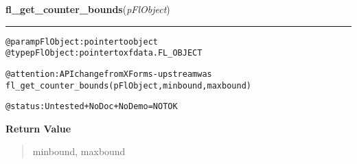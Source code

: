     \label{xformslib:flcounter:fl_get_counter_bounds}

    \vspace{0.5ex}

\hspace{.8\funcindent}\begin{boxedminipage}{\funcwidth}

    \raggedright \textbf{fl\_get\_counter\_bounds}(\textit{pFlObject})

    \vspace{-1.5ex}

    \rule{\textwidth}{0.5\fboxrule}
\setlength{\parskip}{2ex}
\begin{alltt}
        @param pFlObject: pointer to object
@type pFlObject: pointer to xfdata.FL\_OBJECT

        @attention: API change from XForms - upstream was
                    fl\_get\_counter\_bounds(pFlObject, minbound, maxbound)

        @status: Untested + NoDoc + NoDemo = NOT OK
    
\end{alltt}

\setlength{\parskip}{1ex}
      \textbf{Return Value}
    \vspace{-1ex}

      \begin{quote}
      minbound, maxbound

      \end{quote}

    \end{boxedminipage}

    \label{xformslib:flcounter:fl_get_counter_step}

    \vspace{0.5ex}

